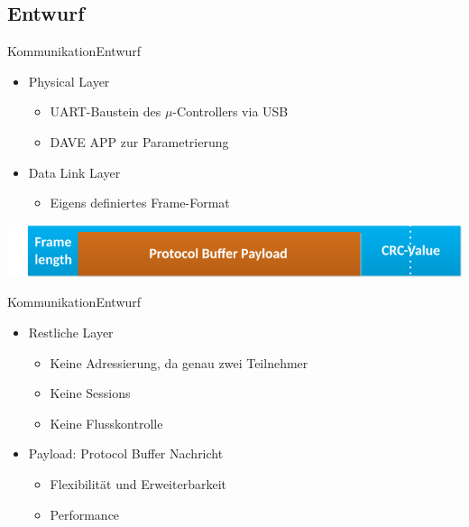 \subsection{Entwurf}
\begin{frame}{Kommunikation}{Entwurf}
  \begin{itemize}
    \item Physical Layer
    \begin{itemize}
      \item UART-Baustein des $\mu$-Controllers via USB
      \item DAVE APP zur Parametrierung
    \end{itemize}
    \item Data Link Layer
    \begin{itemize}
      \item Eigens definiertes Frame-Format
    \end{itemize}
  \end{itemize}
  \begin{center}
    \includegraphics[width=\textwidth]{../communication/MessageFormat}
  \end{center}
\end{frame}
\begin{frame}{Kommunikation}{Entwurf}
  \begin{itemize}
    \item Restliche Layer
    \begin{itemize}
    \item Keine Adressierung, da genau zwei Teilnehmer
    \item Keine Sessions
    \item Keine Flusskontrolle
    \end{itemize}
    \item Payload: Protocol Buffer Nachricht
    \begin{itemize}
      \item Flexibilität und Erweiterbarkeit
      \item Performance
    \end{itemize}
  \end{itemize}
\end{frame}
